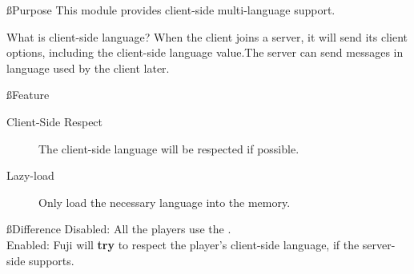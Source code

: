 \ss{Purpose}
This module provides client-side multi-language support.

\begin{note}{What is client-side language?}
    When the client joins a server, it will send its client options, including the client-side language value.The server can send messages in language used by the client later.
\end{note}


\ss{Feature}
\begin{description}
    \item[Client-Side Respect] The client-side language will be respected if possible.
    \item[Lazy-load] Only load the necessary language into the memory.
\end{description}


\ss{Difference}
Disabled: All the players use the .
\\
Enabled: Fuji will \textbf{try} to respect the player's client-side language, if the server-side supports.

